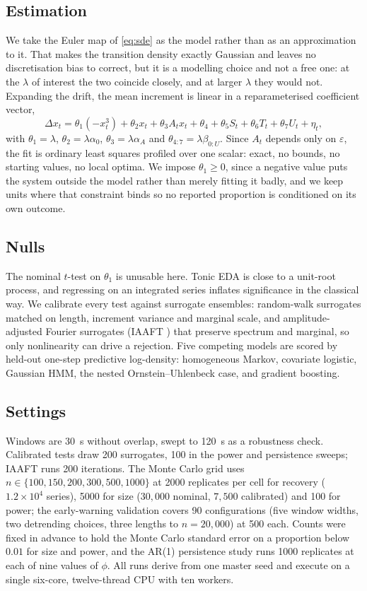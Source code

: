 \documentclass[conference]{IEEEtran}
\begin{document}
\subsection{Estimation}
We take the Euler map of \eqref{eq:sde} as the model rather than as an
approximation to it. That makes the transition density exactly Gaussian and
leaves no discretisation bias to correct, but it is a modelling choice and not
a free one: at the $\lambda$ of interest the two coincide closely, and at
larger $\lambda$ they would not. Expanding the drift, the mean increment is linear in a
reparameterised coefficient vector,
\begin{equation}
\Delta x_t=\theta_1(-x_t^3)+\theta_2 x_t+\theta_3A_tx_t+\theta_4
+\theta_5S_t+\theta_6T_t+\theta_7U_t+\eta_t ,
\label{eq:linear}
\end{equation}
with $\theta_1=\lambda$, $\theta_2=\lambda\alpha_0$, $\theta_3=\lambda\alpha_A$
and $\theta_{4:7}=\lambda\beta_{0:U}$. Since $A_t$ depends only on
$\varepsilon$, the fit is ordinary least squares profiled over one scalar:
exact, no bounds, no starting values, no local optima. We impose
$\theta_1\ge0$, since a negative value puts the system outside the model rather
than merely fitting it badly, and we keep units where that constraint binds so
no reported proportion is conditioned on its own outcome.

\subsection{Nulls}
The nominal $t$-test on $\theta_1$ is unusable here. Tonic EDA is close to a
unit-root process, and regressing on an integrated series inflates significance
in the classical way. We calibrate every test against surrogate ensembles:
random-walk surrogates matched on length, increment variance and marginal scale,
and amplitude-adjusted Fourier surrogates (IAAFT \cite{schreiber1996}) that
preserve spectrum and marginal, so only nonlinearity can drive a rejection.
Five competing models are scored by held-out one-step predictive log-density:
homogeneous Markov, covariate logistic, Gaussian HMM, the nested
Ornstein--Uhlenbeck case, and gradient boosting.

\subsection{Settings}
Windows are \SI{30}{\second} without overlap, swept to \SI{120}{\second} as a
robustness check. Calibrated tests draw 200 surrogates, 100 in the power and
persistence sweeps; IAAFT runs 200 iterations. The Monte Carlo grid uses
$n\in\{100,150,200,300,500,1000\}$ at 2000 replicates per cell for recovery
($1.2\times10^{4}$ series), 5000 for size ($30{,}000$ nominal, $7{,}500$
calibrated) and 100 for power; the early-warning validation covers 90
configurations (five window widths, two detrending choices, three lengths to
$n=20{,}000$) at 500 each. Counts were fixed in advance to hold the Monte Carlo standard error on a
proportion below $0.01$ for size and power, and the AR(1) persistence study
runs 1000 replicates at each of nine values of $\phi$. All runs derive from one
master seed and execute on a single six-core, twelve-thread CPU with ten
workers.
\end{document}
